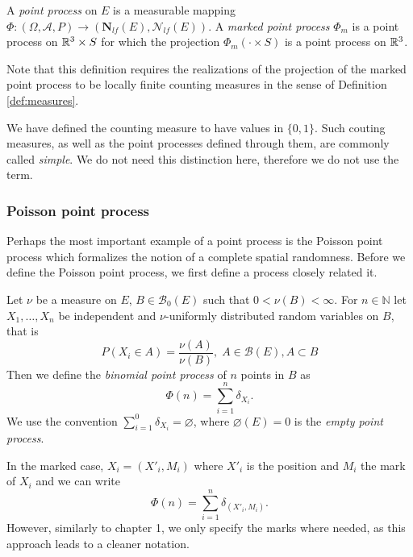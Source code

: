 \begin{definition}
A \textit{point process} on $E$ is a measurable mapping $\Phi:(\Omega,\mathcal A, P) \to (\mathbf N_{lf}(E),\mathcal N_{lf}(E))$. \newline
A \textit{marked point process} $\Phi_m$ is a point process on ${\mathbb R^3}\times S$ for which the projection $\Phi_m(\cdot \times S)$ is a point process on ${\mathbb R^3}$.
\end{definition}
Note that this definition requires the realizations of the projection of the marked point process to be locally finite counting measures in the sense of Definition \ref{def:measures}.

\begin{remark}
	We have defined the counting measure to have values in $\{0,1\}$. Such couting measures, as well as the point processes defined through them, are commonly called \textit{simple}. We do not need this distinction here, therefore we do not use the term.
\end{remark}


\subsubsection{Poisson point process}
Perhaps the most important example of a point process is the Poisson point process which formalizes the notion of a complete spatial randomness. Before we define the Poisson point process, we first define a process closely related it.

\begin{definition} Let $\nu$ be a measure on $E$, $B \in \mathcal B_0(E)$ such that $0<\nu(B)<\infty$. For $n\in \mathbb N$ let $X_1,\dots,X_n$ be independent and $\nu$-uniformly distributed random variables on $B$, that is
	$$P(X_i \in A) = \frac{\nu(A)}{\nu(B)},\; A\in\mathcal B(E), A \subset B$$
Then we define the \textit{binomial point process} of $n$ points in $B$ as
$$\Phi(n) = \sum^{n}_{i=1}  \delta_{X_i}.$$
We use the convention $\sum^0_{i=1} \delta_{X_i} = \varnothing$, where $\varnothing(E)=0$ is the \textit{empty point process}.
\end{definition}
In the marked case, $X_i=(X'_i,M_i)$ where $X'_i$ is the position and $M_i$ the mark of $X_i$ and we can write
$$\Phi(n) = \sum^{n}_{i=1} \delta_{(X'_i,M_i)}.$$
However, similarly to chapter 1, we only specify the marks where needed, as this approach leads to a cleaner notation. 

